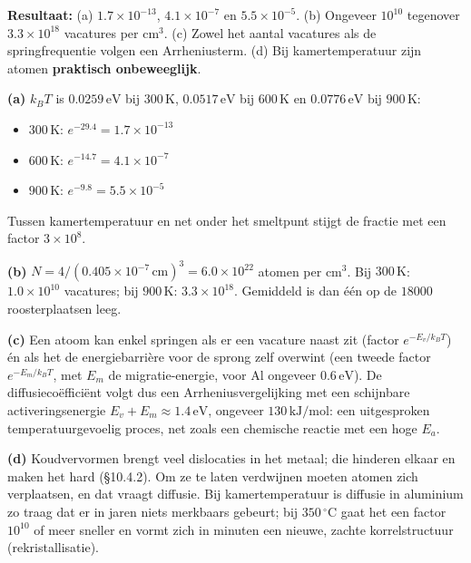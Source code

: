 \begin{oplossing}
\textbf{Resultaat:} (a) \textbf{\(1.7\times10^{-13}\)}, \textbf{\(4.1\times10^{-7}\)} en \textbf{\(5.5\times10^{-5}\)}. (b) Ongeveer \textbf{\(10^{10}\)} tegenover \textbf{\(3.3\times10^{18}\)} vacatures per cm\ensuremath{^{3}}. (c) Zowel het aantal vacatures als de springfrequentie volgen een Arrheniusterm. (d) Bij kamertemperatuur zijn atomen \textbf{praktisch onbeweeglijk}.

\textbf{(a)} \(k_BT\) is \(0.0259\,\mathrm{eV}\) bij \(300\,\mathrm{K}\), \(0.0517\,\mathrm{eV}\) bij \(600\,\mathrm{K}\) en \(0.0776\,\mathrm{eV}\) bij \(900\,\mathrm{K}\):

\begin{itemize}
\item
  \(300\,\mathrm{K}\): \(e^{-29.4} = 1.7\times10^{-13}\)
\item
  \(600\,\mathrm{K}\): \(e^{-14.7} = 4.1\times10^{-7}\)
\item
  \(900\,\mathrm{K}\): \(e^{-9.8} = 5.5\times10^{-5}\)
\end{itemize}

Tussen kamertemperatuur en net onder het smeltpunt stijgt de fractie met een factor \(3\times10^{8}\).

\textbf{(b)} \(N = 4/(0.405\times10^{-7}\,\mathrm{cm})^3 = 6.0\times10^{22}\) atomen per cm\ensuremath{^{3}}. Bij \(300\,\mathrm{K}\): \(1.0\times10^{10}\) vacatures; bij \(900\,\mathrm{K}\): \(3.3\times10^{18}\). Gemiddeld is dan één op de \(18000\) roosterplaatsen leeg.

\textbf{(c)} Een atoom kan enkel springen als er een vacature naast zit (factor \(e^{-E_v/k_BT}\)) én als het de energiebarrière voor de sprong zelf overwint (een tweede factor \(e^{-E_m/k_BT}\), met \(E_m\) de migratie-energie, voor Al ongeveer \(0.6\,\mathrm{eV}\)). De diffusiecoëfficiënt volgt dus een Arrheniusvergelijking met een schijnbare activeringsenergie \(E_v + E_m \approx 1.4\,\mathrm{eV}\), ongeveer \(130\,\mathrm{kJ/mol}\): een uitgesproken temperatuurgevoelig proces, net zoals een chemische reactie met een hoge \(E_a\).

\textbf{(d)} Koudvervormen brengt veel dislocaties in het metaal; die hinderen elkaar en maken het hard (§10.4.2). Om ze te laten verdwijnen moeten atomen zich verplaatsen, en dat vraagt diffusie. Bij kamertemperatuur is diffusie in aluminium zo traag dat er in jaren niets merkbaars gebeurt; bij \(350\,^\circ\mathrm{C}\) gaat het een factor \(10^{10}\) of meer sneller en vormt zich in minuten een nieuwe, zachte korrelstructuur (rekristallisatie).
\end{oplossing}

